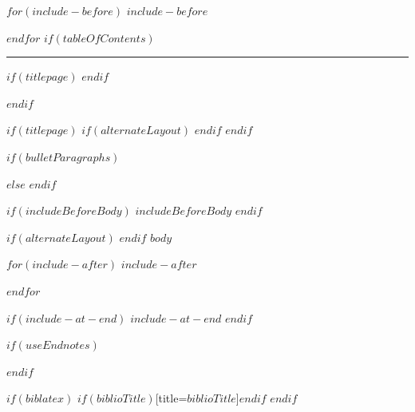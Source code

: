 \documentclass[$if(fontSize)$$fontSize$,%
	$if(language)$$language$,$else$english,$endif$%
	$if(paperSize)$$paperSize$,$else$ a4paper,%
	$endif$$if(classOptions)$$classOptions$,$endif$%
	$if(twoSided)$twoside,$endif$%
	$if(titlepage)$titlepage,$endif$%
	$if(centerEqs)$$else$fleqn$endif$]{$if(documentClass)$%
		$documentClass$$else$article$endif$}
\begin{document}
$for(include-before)$
$include-before$

$endfor$
$if(tableOfContents)$
{
\hypersetup{linkcolor=black}
\setcounter{tocdepth}{$toc-depth$}
\tableofcontents
}

\noindent\rule{\linewidth}{0.05em}

$if(titlepage)$
\newpage
$endif$


$endif$



$if(titlepage)$
    $if(alternateLayout)$
        \restoregeometry
    $endif$
$endif$

$if(bulletParagraphs)$
\let\oldep\everypar  \newtoks\everypar  \oldep{\the\everypar\hbox{\P}}

\makeatletter
\def\@sect#1#2#3#4#5#6[#7]#8{%
  \ifnum #2>\c@secnumdepth
    \let\@svsec\@empty
  \else
    \refstepcounter{#1}%
    \protected@edef\@svsec{\@seccntformat{#1}\relax}%
  \fi
  \@tempskipa #5\relax
  \ifdim \@tempskipa>\z@
    \begingroup
      #6{%
        \@hangfrom{\hskip #3\relax\@svsec}%
          \interlinepenalty \@M 
\leavevmode \setbox\z@\lastbox\setbox\tw@\lastbox\box\z@
#8\@@par}%
    \endgroup
    \csname #1mark\endcsname{#7}%
    \addcontentsline{toc}{#1}{%
      \ifnum #2>\c@secnumdepth \else
        \protect\numberline{\csname the#1\endcsname}%
      \fi
      #7}%
  \else
    \def\@svsechd{%
      #6{\hskip #3\relax
      \@svsec #8}%
      \csname #1mark\endcsname{#7}%
      \addcontentsline{toc}{#1}{%
        \ifnum #2>\c@secnumdepth \else
          \protect\numberline{\csname the#1\endcsname}%
        \fi
        #7}}%
  \fi
  \@xsect{#5}}

\makeatother
$else$
$endif$


$if(includeBeforeBody)$
    $includeBeforeBody$
$endif$

$if(alternateLayout)$
    \pagestyle{fancy}
$endif$
$body$

$for(include-after)$
$include-after$

$endfor$

$if(include-at-end)$
$include-at-end$
$endif$


$if(useEndnotes)$
\renewcommand{\notesname}{~}



\def\enotesize{\normalsize}
\theendnotes
$endif$


$if(biblatex)$
\printbibliography$if(biblioTitle)$[title=$biblioTitle$]$endif$
$endif$
\end{document}
